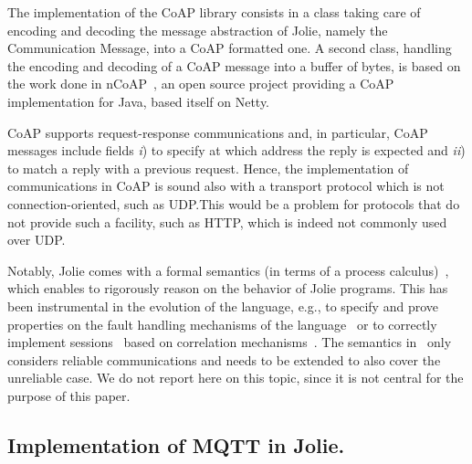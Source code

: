 The implementation of the CoAP library consists in a class taking care of encoding and decoding the message abstraction of Jolie, namely the Communication Message, into a CoAP formatted one. A second class, handling the encoding and decoding of a CoAP message into a buffer of bytes, is based on the work done in nCoAP~\cite{ncoap}, an open source project providing a CoAP implementation for Java, based itself on Netty.

CoAP supports request-response communications and, in particular, CoAP messages
include fields \emph{i}) to specify at which address the reply is expected and
\emph{ii}) to match a reply with a previous request. Hence, the implementation
of  communications in CoAP is sound also with a transport
protocol which is not connection-oriented, such as UDP.\@ This would be a
problem for protocols that do not provide such a facility, such as HTTP, which
is indeed not commonly used over UDP.

Notably, Jolie comes with a formal semantics (in terms of a process
calculus)~\cite{Guidi2006}, which enables to rigorously reason on the behavior
of Jolie programs. This has been instrumental in the evolution of the language,
e.g., to specify and prove properties on the fault handling mechanisms of the
language~\cite{GuidiLMZ09} or to correctly implement sessions~\cite{MontesiC11}
based on correlation mechanisms~\cite{bpel}. The semantics in~\cite{Guidi2006}
only considers reliable communications and needs to be extended to also cover
the unreliable case. We do not report here on this topic, since it is not
central for the purpose of this paper.

\subsection{Implementation of MQTT in Jolie.} %
\label{sub:impl_mqtt}

